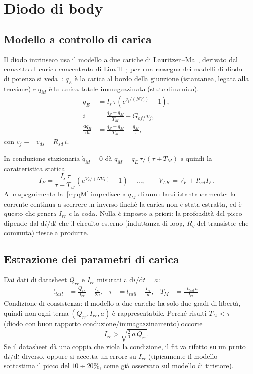 \documentclass[11pt,a4paper]{article}
\newcommand{\ud}{\mathrm{d}}
\begin{document}
\section{Diodo di body}

\subsection{Modello a controllo di carica}

Il diodo intrinseco usa il modello a due cariche di
Lauritzen--Ma~\cite{Lauritzen1991,Ma1997}, derivato dal concetto di carica
concentrata di Linvill~\cite{Linvill1958}; per una rassegna dei modelli di
diodo di potenza si veda~\cite{Tan1999}:
$q_E$ è la carica al bordo della giunzione (istantanea, legata alla
tensione) e $q_M$ è la carica totale immagazzinata (stato dinamico).
\begin{align}
  q_E &= I_s\,\tau\left(e^{v_j/(NV_T)}-1\right), \label{eq:qE}\\
  i   &= \frac{q_E-q_M}{T_M} + G_{off}\,v_j, \label{eq:ilm}\\
  \frac{\ud q_M}{\ud t} &= \frac{q_E-q_M}{T_M}-\frac{q_M}{\tau},
  \label{eq:qM}
\end{align}
con $v_j=-v_{ds}-R_{sd}\,i$.

In conduzione stazionaria $\dot q_M=0$ dà $q_M=q_E\,\tau/(\tau+T_M)$ e
quindi la caratteristica statica
\begin{equation}
  I_F=\frac{I_s\,\tau}{\tau+T_M}\left(e^{V_F/(NV_T)}-1\right)+\ldots,
  \qquad V_{AK}=V_F+R_{sd}I_F .
\end{equation}
Allo spegnimento la~\eqref{eq:qM} impedisce a $q_M$ di annullarsi
istantaneamente: la corrente continua a scorrere in inverso finché la carica
non è stata estratta, ed è questo che genera $I_{rr}$ e la coda. Nulla è
imposto a priori: la profondità del picco dipende dal $\ud i/\ud t$ che il
circuito esterno (induttanza di loop, $R_g$ del transistor che commuta)
riesce a produrre.

\subsection{Estrazione dei parametri di carica}

Dai dati di datasheet $Q_{rr}$ e $I_{rr}$ misurati a $\ud i/\ud t=a$:
\begin{align}
  t_{tail}&=\frac{Q_{rr}}{I_{rr}}-\frac{I_{rr}}{2a}, &
  \tau &= t_{tail}+\frac{I_{rr}}{a}, &
  T_M &= \frac{\tau\,t_{tail}\,a}{I_{rr}} .
  \label{eq:extract}
\end{align}
Condizione di consistenza: il modello a due cariche ha solo due gradi di
libertà, quindi non ogni terna $(Q_{rr},I_{rr},a)$ è rappresentabile. Perché
risulti $T_M<\tau$ (diodo con buon rapporto conduzione/immagazzinamento)
occorre
\begin{equation}
  I_{rr}>\sqrt{\tfrac{2}{3}\,a\,Q_{rr}} .
\end{equation}
Se il datasheet dà una coppia che viola la condizione, il fit va rifatto su
un punto $\ud i/\ud t$ diverso, oppure si accetta un errore su $I_{rr}$
(tipicamente il modello sottostima il picco del $10\div20\%$, come già
osservato sul modello di tiristore).
\end{document}
